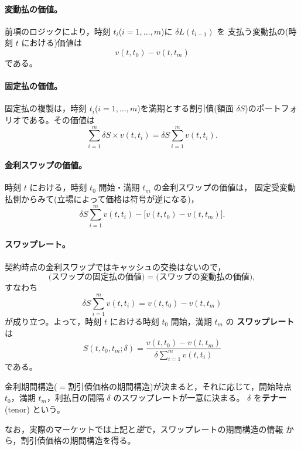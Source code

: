 \paragraph{変動払の価値。}
前項のロジックにより，時刻 $t_i$($i=1,\dots,m$)に $\delta L(t_{i-1})$ を
支払う変動払の(時刻 $t$ における)価値は
\begin{equation}
v(t,t_0) - v(t,t_m)
\label{eq:float-leg}
\end{equation}
である。

\paragraph{固定払の価値。}
固定払の複製は，時刻 $t_i$($i=1,\dots,m$)を満期とする割引債(額面
$\delta S$)のポートフォリオである。その価値は
\begin{equation}
\sum_{i=1}^{m}\delta S \times v(t,t_i)
= \delta S\sum_{i=1}^{m} v(t,t_i).
\label{eq:fixed-leg}
\end{equation}

\paragraph{金利スワップの価値。}
時刻 $t$ における，時刻 $t_0$ 開始・満期 $t_m$ の金利スワップの価値は，
固定受変動払側からみて(立場によって価格は符号が逆になる)，
\begin{equation}
\delta S\sum_{i=1}^{m} v(t,t_i) - \bigl[v(t,t_0) - v(t,t_m)\bigr].
\end{equation}

\paragraph{スワップレート。}
契約時点の金利スワップではキャッシュの交換はないので，
\[
\text{(スワップの固定払の価値)} = \text{(スワップの変動払の価値)},
\]
すなわち
\begin{equation}
\delta S\sum_{i=1}^{m}v(t,t_i) = v(t,t_0) - v(t,t_m)
\end{equation}
が成り立つ。よって，時刻 $t$ における時刻 $t_0$ 開始，満期 $t_m$ の
\textbf{スワップレート}は
\begin{equation}
S(t, t_0, t_m; \delta)
= \frac{v(t,t_0) - v(t,t_m)}{\delta\sum_{i=1}^{m}v(t,t_i)}
\label{eq:swap-rate}
\end{equation}
である。

\begin{keypoint}
金利期間構造($=$割引債価格の期間構造)が決まると，それに応じて，開始時点
$t_0$，満期 $t_m$，利払日の間隔 $\delta$ のスワップレートが一意に決まる。
$\delta$ を\textbf{テナー} (tenor) という。

なお，実際のマーケットでは上記と\emph{逆}で，スワップレートの期間構造の情報
から，割引債価格の期間構造を得る。
\end{keypoint}

